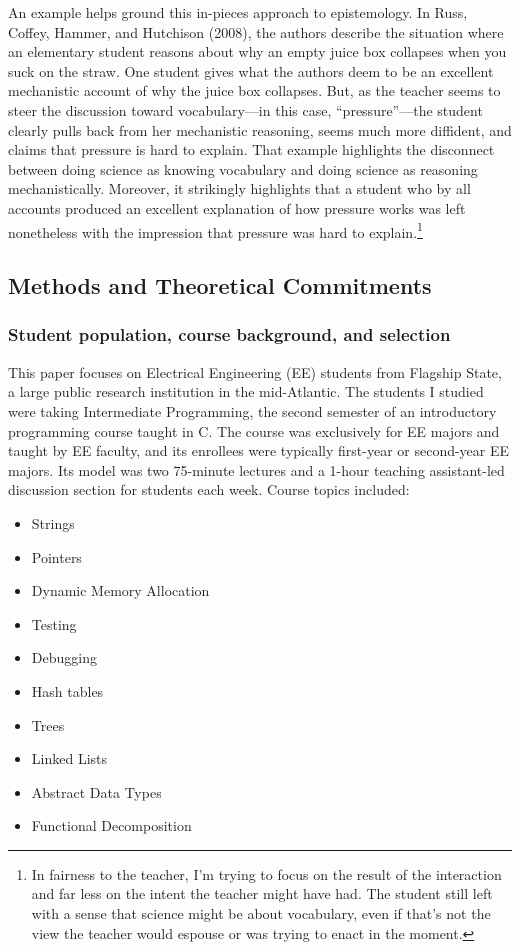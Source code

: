 An example helps ground this in-pieces approach to epistemology. In
Russ, Coffey, Hammer, and Hutchison (2008), the authors describe the
situation where an elementary student reasons about why an empty juice
box collapses when you suck on the straw. One student gives what the
authors deem to be an excellent mechanistic account of why the juice box
collapses. But, as the teacher seems to steer the discussion toward
vocabulary---in this case, ``pressure''---the student clearly pulls back
from her mechanistic reasoning, seems much more diffident, and claims
that pressure is hard to explain. That example highlights the disconnect
between doing science as knowing vocabulary and doing science as
reasoning mechanistically. Moreover, it strikingly highlights that a
student who by all accounts produced an excellent explanation of how
pressure works was left nonetheless with the impression that pressure
was hard to explain.\footnote{In fairness to the teacher, I'm trying to
  focus on the result of the interaction and far less on the intent the
  teacher might have had. The student still left with a sense that
  science might be about vocabulary, even if that's not the view the
  teacher would espouse or was trying to enact in the moment.}

\subsection{Methods and Theoretical
Commitments}\label{methods-and-theoretical-commitments}

\subsubsection{Student population, course background, and selection
}\label{student-population-course-background-and-selection}

This paper focuses on Electrical Engineering (EE) students from Flagship
State, a large public research institution in the mid-Atlantic. The
students I studied were taking Intermediate Programming, the second
semester of an introductory programming course taught in C. The course
was exclusively for EE majors and taught by EE faculty, and its
enrollees were typically first-year or second-year EE majors. Its model
was two 75-minute lectures and a 1-hour teaching assistant-led
discussion section for students each week. Course topics included:

\begin{itemize}
\item
  Strings
\item
  Pointers
\item
  Dynamic Memory Allocation
\item
  Testing
\item
  Debugging
\item
  Hash tables
\item
  Trees
\item
  Linked Lists
\item
  Abstract Data Types
\item
  Functional Decomposition
\end{itemize}

